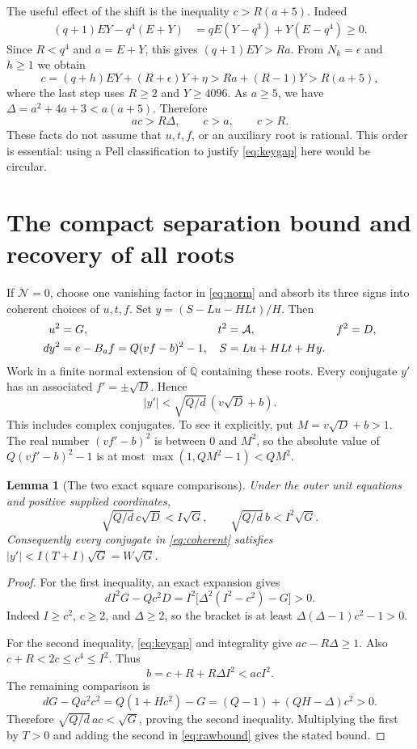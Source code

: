\documentclass[11pt]{article}
\newtheorem{lemma}[theorem]{Lemma}
\theoremstyle{remark}\newtheorem{remark}[theorem]{Remark}
\begin{document}
The useful effect of the shift is the inequality $c>R(a+5)$.
Indeed
\begin{align*}
 (q+1)EY-q^4(E+Y)
 &=qE(Y-q^3)+Y(E-q^4)\geq0.
\end{align*}
Since $R<q^4$ and $a=E+Y$, this gives $(q+1)EY>Ra$. From
$N_k=\epsilon$ and $h\geq1$ we obtain
\[
 c=(q+h)EY+(R+\epsilon)Y+\eta
    >Ra+(R-1)Y>R(a+5),
\]
where the last step uses $R\geq2$ and $Y\geq4096$.
As $a\geq5$, we have $\Delta=a^2+4a+3<a(a+5)$. Therefore
\begin{equation}
 \boxed{\quad ac>R\Delta,\qquad c>a,\qquad c>R.\quad}
 \label{eq:keygap}
\end{equation}
These facts do not assume that $u,t,f$, or an auxiliary root is rational.
This order is essential: using a Pell classification to justify
\eqref{eq:keygap} here would be circular.

\section{The compact separation bound and recovery of all roots}
\label{sec:separation}

If $\mathcal N=0$, choose one vanishing factor in \eqref{eq:norm} and
absorb its three signs into coherent choices of $u,t,f$. Set
$y=(S-Lu-HLt)/H$. Then
\begin{align}
 u^2&=G,&t^2&=\mathcal A,&f^2&=D,\notag\\
 d y^2&=e-B_af=Q(vf-b)^2-1,&
 S&=Lu+HLt+Hy.\label{eq:coherent}
\end{align}
Work in a finite normal extension of $\mathbb Q$ containing these roots.
Every conjugate $y'$ has an associated $f'=\pm\sqrt D$. Hence
\begin{equation}
 |y'|<\sqrt{Q/d}\,(v\sqrt D+b).\label{eq:rawbound}
\end{equation}
This includes complex conjugates. To see it explicitly, put
$M=v\sqrt D+b>1$. The real number $(vf'-b)^2$ is between $0$ and
$M^2$, so the absolute value of $Q(vf'-b)^2-1$ is at most
$\max(1,QM^2-1)<QM^2$.

\begin{lemma}[The two exact square comparisons]\label{lem:bound}
Under the outer unit equations and positive supplied coordinates,
\[
 \sqrt{Q/d}\,c\sqrt D<I\sqrt G,
 \qquad \sqrt{Q/d}\,b<I^2\sqrt G.
\]
Consequently every conjugate in \eqref{eq:coherent} satisfies
$|y'|<I(T+I)\sqrt G=W\sqrt G$.
\end{lemma}
\begin{proof}
For the first inequality, an exact expansion gives
\[
 dI^2G-Qc^2D
  =I^2\bigl[\Delta^2(I^2-c^2)-G\bigr]>0.
\]
Indeed $I\geq c^2$, $c\geq2$, and $\Delta\geq2$, so the bracket
is at least $\Delta(\Delta-1)c^2-1>0$.

For the second inequality, \eqref{eq:keygap} and integrality give
$ac-R\Delta\geq1$. Also $c+R<2c\leq c^4\leq I^2$. Thus
\[
 b=c+R+R\Delta I^2<acI^2.
\]
The remaining comparison is
\[
 dG-Qa^2c^2=Q(1+Hc^2)-G
           =(Q-1)+(QH-\Delta)c^2>0.
\]
Therefore $\sqrt{Q/d}\,ac<\sqrt G$, proving the second inequality.
Multiplying the first by $T>0$ and adding the second in
\eqref{eq:rawbound} gives the stated bound.
\end{proof}
\end{document}
